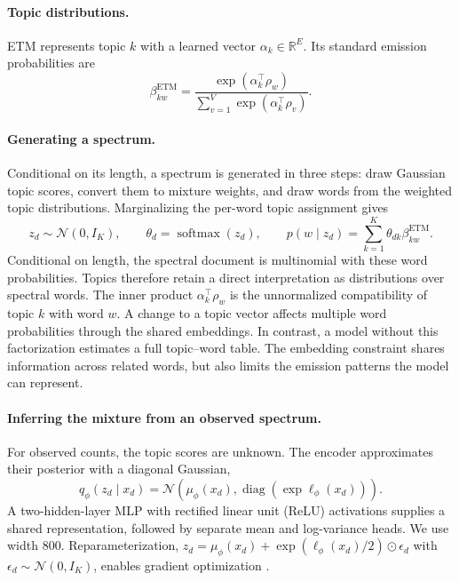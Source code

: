 \documentclass[10pt,a4paper]{article}
\newcommand{\softmax}{\operatorname{softmax}}
\begin{document}
\paragraph{Topic distributions.}
ETM represents topic $k$ with a learned vector $\alpha_k\in\mathbb R^E$.
Its standard emission probabilities are
\begin{equation}
 \beta^{\mathrm{ETM}}_{kw}
 =\frac{\exp(\alpha_k^\top\rho_w)}
        {\sum_{v=1}^{V}\exp(\alpha_k^\top\rho_v)}.
 \label{eq:base-beta}
\end{equation}
\paragraph{Generating a spectrum.}
Conditional on its length, a spectrum is generated in three steps: draw
Gaussian topic scores, convert them to mixture weights, and draw words from
the weighted topic distributions. Marginalizing the per-word topic assignment
gives
\begin{equation}
 z_d\sim\mathcal N(0,I_K),\qquad
 \theta_d=\softmax(z_d),\qquad
 p(w\mid z_d)=\sum_{k=1}^{K}\theta_{dk}\beta^{\mathrm{ETM}}_{kw}.
 \label{eq:base-generator}
\end{equation}
Conditional on length, the spectral document is multinomial with these word
probabilities. Topics therefore retain a direct interpretation as
distributions over spectral words. The inner product
$\alpha_k^\top\rho_w$ is the unnormalized compatibility of topic $k$ with
word $w$. A change to a topic vector affects multiple word probabilities
through the shared embeddings. In contrast, a model without this factorization
estimates a full topic--word table. The embedding constraint shares information
across related words, but also limits the emission patterns the model can represent.

\paragraph{Inferring the mixture from an observed spectrum.}
For observed counts, the topic scores are unknown. The encoder approximates
their posterior with a diagonal Gaussian,
\begin{equation}
 q_\phi(z_d\mid x_d)
 =\mathcal N\!\left(\mu_\phi(x_d),
          \operatorname{diag}(\exp\ell_\phi(x_d))\right).
 \label{eq:base-posterior}
\end{equation}
A two-hidden-layer MLP with rectified linear unit (ReLU) activations supplies a shared representation,
followed by separate mean and log-variance heads. We use width 800.
Reparameterization,
$z_d=\mu_\phi(x_d)+\exp(\ell_\phi(x_d)/2)\odot\epsilon_d$ with
$\epsilon_d\sim\mathcal N(0,I_K)$, enables gradient optimization
\cite{dieng2020}.
\end{document}
